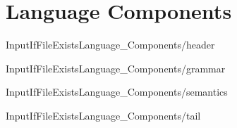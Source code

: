 \chapter{Language Components}

InputIfFileExists{Language_Components/header}{}{}

InputIfFileExists{Language_Components/grammar}{}{}

InputIfFileExists{Language_Components/semantics}{}{}

InputIfFileExists{Language_Components/tail}{}{}